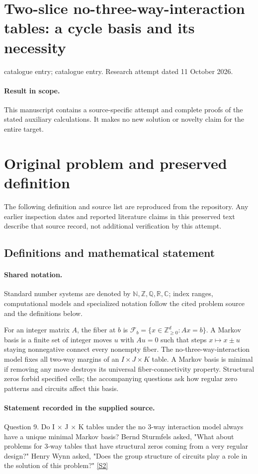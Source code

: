 \documentclass[11pt]{article}
\begin{document}
\section*{Two-slice no-three-way-interaction tables: a cycle basis and its necessity}
\noindent catalogue entry; catalogue entry. Research attempt dated 11 October 2026.
\paragraph{Result in scope.}This manuscript contains a source-specific attempt and complete proofs of the stated auxiliary calculations. It makes no new solution or novelty claim for the entire target.
\section{Original problem and preserved definition}
The following definition and source list are reproduced from the repository. Any earlier inspection dates and reported literature claims in this preserved text describe that source record, not additional verification by this attempt.
\subsection{Definitions and mathematical statement}

\paragraph{Shared notation.}Standard number systems are denoted by $\mathbb N,\mathbb Z,\mathbb Q,\mathbb R,\mathbb C$; index ranges, computational models and specialized notation follow the cited problem source and the definitions below.


For an integer matrix $A$, the fiber at $b$ is $\mathcal F_b=\{x\in\mathbb Z_{\ge0}^d:Ax=b\}$. A Markov basis is a finite set of integer moves $u$ with $Au=0$ such that steps $x\mapsto x\pm u$ staying nonnegative connect every nonempty fiber. The no-three-way-interaction model fixes all two-way margins of an $I\times J\times K$ table. A Markov basis is minimal if removing any move destroys its universal fiber-connectivity property. Structural zeros forbid specified cells; the accompanying questions ask how regular zero patterns and circuits affect this basis.
\paragraph{Statement recorded in the supplied source.}
Question 9. Do I × J × K tables under the no 3-way interaction model always have a unique minimal Markov basis? Bernd Sturmfels asked, "What about problems for 3-way tables that have structural zeros coming from a very regular design?" Henry Wynn asked, "Does the group structure of circuits play a role in the solution of this problem?" \href{https://aimath.org/WWN/compalgstat/compalgstat.pdf}{[S2]}
\end{document}
